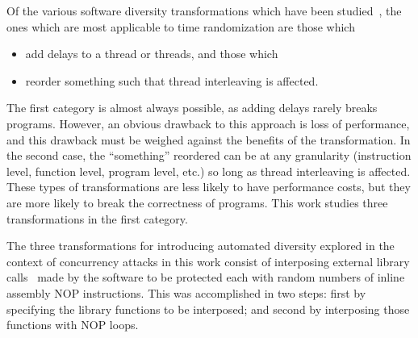 Of the various software diversity transformations which have been studied~\cite{Larsen2014}, the ones which are most applicable to time randomization are those which
\begin{itemize}
	\item add delays to a thread or threads, and those which
	\item reorder something such that thread interleaving is affected.
\end{itemize}
The first category is almost always possible, as adding delays rarely breaks programs.
However, an obvious drawback to this approach is loss of performance, and this drawback must be weighed against the benefits of the transformation.
In the second case, the ``something'' reordered can be at any granularity (instruction level, function level, program level, etc.) so long as thread interleaving is affected.
These types of transformations are less likely to have performance costs, but they are more likely to break the correctness of programs.
This work studies three transformations in the first category.

The three transformations for introducing automated diversity explored in the context of concurrency attacks in this work consist of interposing external library calls~\cite{Conrod2009} made by the software to be protected each with random numbers of inline assembly NOP instructions.
This was accomplished in two steps: first by specifying the library functions to be interposed; and second by interposing those functions with NOP loops.
